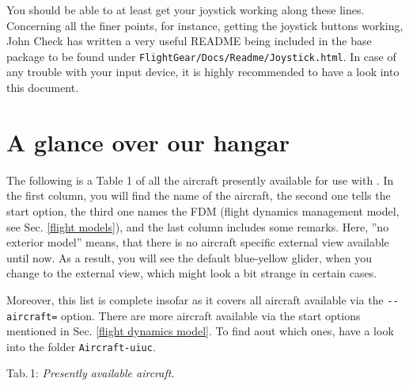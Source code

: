 You should be able to at least get your joystick working along
these lines. Concerning all the finer points, for instance, getting the joystick buttons
working, John Check has written a very useful README being included in the base package to be found under \texttt{FlightGear/Docs/Readme/Joystick.html}. In case of any trouble with your input device, it is highly recommended to have a look into this document.

\section{A glance over our hangar}\label{hangar}
The following is a Table 1 of all the aircraft presently available for use with \FlightGear{}. In the first column, you will find the name of the aircraft, the second one tells the start option, the third one names the FDM (flight dynamics management model, see Sec. \ref{flight models}), and the last column includes some remarks. Here, ''no exterior model'' means, that there is no aircraft specific external view available until now. As a result, you will see the default blue-yellow glider, when you change to the external view, which might look a bit strange in certain cases.

Moreover, this list is complete insofar as it covers all aircraft  available via the \texttt{-$ $-aircraft=} option. There are more aircraft available via the start options mentioned in Sec. \ref{flight dynamics model}. To find aout which ones, have a look into the folder \texttt{Aircraft-uiuc}.
\bigskip

\noindent
 Tab.\,1: \textit{Presently available aircraft}.
 \medskip
 
